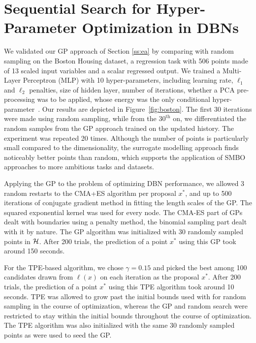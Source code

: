 \documentclass{article}
\newcommand{\vs}[1]{\vspace*{-#1mm}}
\newcommand{\Bs}{\vs{2}}
\newcommand{\as}{\vs{1}}
\newcommand{\ass}{\vs{0.7}}
\begin{document}
\Bs
\section{Sequential Search for Hyper-Parameter Optimization in DBNs}

\label{sec:exp}
We validated our GP approach of Section \ref{ss:ea} by comparing
with random sampling on the Boston
Housing dataset, a regression task with 506 points made of 13 scaled
input variables and a scalar regressed output. We trained a
Multi-Layer Perceptron (MLP) with 10 hyper-parameters,
including learning rate, $\ell_1$ and $\ell_2$ penalties, size of hidden
layer, number of iterations, whether a PCA pre-processing was to be
applied, whose energy was the only conditional hyper-parameter~\citep{Bis95}. Our
results are depicted in Figure~\ref{fig:boston}. The first 30 iterations
were made using random sampling, while from the $30^{\mathrm{th}}$ on, we
differentiated the random samples from the GP approach trained on the
updated history. The experiment was repeated 20 times. Although the
number of points is particularly small compared to the dimensionality,
the surrogate modelling approach finds noticeably better points than
random, which supports the application of SMBO approaches to
more ambitious tasks and datasets.

Applying the GP to the problem of optimizing DBN performance,
we allowed 3 random restarts to the CMA+ES algorithm per proposal $x^*$,
and up to 500 iterations of conjugate gradient method in fitting the
length scales of the GP. The squared
exponential kernel \cite{RaWi06} was used for every node. The CMA-ES part of GPs
dealt with boundaries using a penalty method, the binomial sampling
part dealt with it by nature.
The GP algorithm was initialized with 30 randomly sampled points in ${\cal H}$.
After 200 trials, the prediction of a point $x^*$ using this GP took around 150 seconds.

For the TPE-based algorithm, we chose $\gamma=0.15$ and picked the best among 100 candidates drawn from $\ell(x)$
on each iteration as the proposal $x^*$.  After 200 trials, the prediction of
a point $x^*$ using this TPE algorithm
took around 10 seconds.
TPE was allowed to grow past the initial bounds used with for
random sampling in the course of optimization, whereas the GP and random search
were restricted to stay within the initial bounds
throughout the course of optimization.
The TPE algorithm was also initialized with the same 30 randomly sampled points
as were used to seed the GP.
\end{document}
